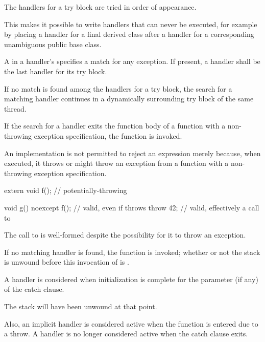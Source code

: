 \pnum
The handlers for a try block are tried in order of appearance.
\begin{note}
This makes it possible to write handlers that can never be
executed, for example by placing a handler for a final derived class after
a handler for a corresponding unambiguous public base class.
\end{note}

\pnum
A
in a handler's
specifies a match for any exception.
If present, a
handler shall be the last handler for its try block.

\pnum
If no match is found among the handlers for a try block,
the search for a matching
handler continues in a dynamically surrounding try block
of the same thread.

\pnum
{}%
%
If the search for a handler
exits the function body of a function with a
non-throwing exception specification,
the function  is invoked.
\begin{note}
An implementation is not permitted to reject an expression merely because, when
executed, it throws or might
throw an exception from a function with a non-throwing exception specification.
\end{note}
\begin{example}
\begin{codeblock}
extern void f();                // potentially-throwing

void g() noexcept {
  f();                          // valid, even if  throws
  throw 42;                     // valid, effectively a call to 
}
\end{codeblock}
The call to
is well-formed despite the possibility for it to throw an exception.
\end{example}

\pnum
If no matching handler is found,
the function  is invoked;
whether or not the stack is unwound before this invocation of
is .

\pnum
A handler is considered  when
initialization is complete for the parameter (if any) of the catch clause.
\begin{note}
The stack will have been unwound at that point.
\end{note}
Also, an implicit handler is considered active when
the function 
is entered due to a throw. A handler is no longer considered active when the
catch clause exits.

